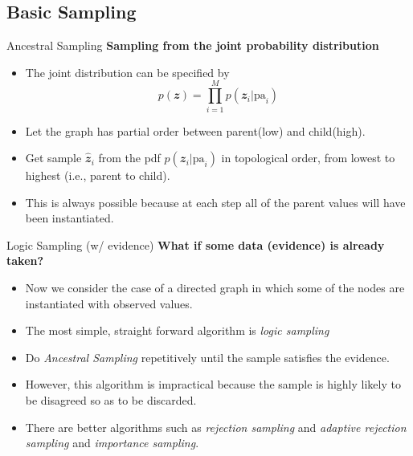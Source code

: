\documentclass{bredelebeamer}
\begin{document}
\subsection{Basic Sampling}
\begin{frame}{Ancestral Sampling}
  \textbf{Sampling from the joint probability distribution} \\
  \begin{itemize}
    \item The joint distribution can be specified by
    \begin{equation}
      p(\mathbfit{z}) = \prod_{i=1}^{M}p(\mathbfit{z}_i | \mathrm{pa}_i)
    \end{equation}
    \item Let the graph has partial order between parent(low) and child(high).
    \item Get sample $\mathbfit{\hat{z}}_i$ from the pdf $p(\mathbfit{z}_i | \mathrm{pa}_i)$
    in topological order, from lowest to highest (i.e., parent to child).
    \item This is always possible because at each step all of the parent values
    will have been instantiated.
  \end{itemize}
\end{frame}

\begin{frame}{Logic Sampling (w/ evidence)}
  \textbf{What if some data (evidence) is already taken?} \\
  \begin{itemize}
    \item Now we consider the case of a directed graph in which some of the
    nodes are instantiated with observed values.
    \item The most simple, straight forward algorithm is \textit{logic sampling}
    \item Do \textit{Ancestral Sampling} repetitively until the sample satisfies
    the evidence.
    \item However, this algorithm is impractical because the sample is highly
    likely to be disagreed so as to be discarded.
    \item There are better algorithms such as \textit{rejection sampling} and
    \textit{adaptive rejection sampling} and \textit{importance sampling}.
  \end{itemize}
\end{frame}
\end{document}
